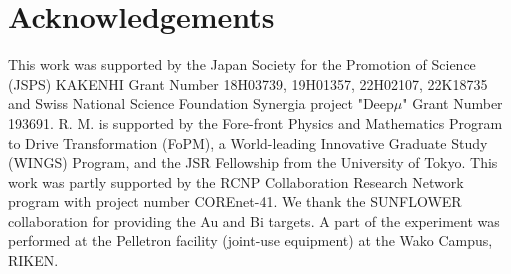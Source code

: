\section*{Acknowledgements}
This work was supported by the Japan Society for the Promotion of Science (JSPS) KAKENHI Grant Number 18H03739, 19H01357, 22H02107, 22K18735 and Swiss National Science Foundation Synergia project "Deep$\mu$" Grant Number 193691. R. M. is supported by the Fore-front Physics and Mathematics Program to Drive Transformation (FoPM), a World-leading Innovative Graduate Study (WINGS) Program, and the JSR Fellowship from the University of Tokyo. 
This work was partly supported by the RCNP Collaboration Research Network program with project number COREnet-41.
We thank the SUNFLOWER collaboration for providing the Au and Bi targets. 
A part of the experiment was performed at the Pelletron facility (joint-use equipment) at the Wako Campus, RIKEN.
